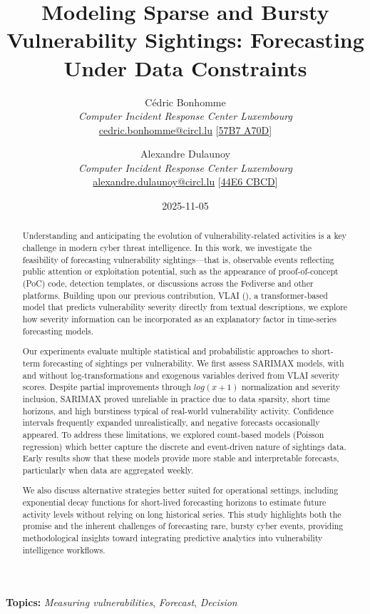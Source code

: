 \documentclass[]{article}
\title{\textbf{Modeling Sparse and Bursty Vulnerability Sightings: Forecasting Under Data Constraints}}
\author{
    Cédric Bonhomme \\
    \textit{Computer Incident Response Center Luxembourg} \\
    \href{mailto:cedric.bonhomme@circl.lu}{cedric.bonhomme@circl.lu} [\href{https://openpgp.circl.lu/pks/lookup?op=get\&search=0xA1CB94DE57B7A70D}{57B7 A70D}]
    \and
    Alexandre Dulaunoy \\
    \textit{Computer Incident Response Center Luxembourg} \\
    \href{mailto:alexandre.dulaunoy@circl.lu}{alexandre.dulaunoy@circl.lu} [\href{https://pgp.circl.lu/pks/lookup?op=get\&search=0x3b12dcc282fa29312f5b709a09e2cd4944e6cbcd}{44E6 CBCD}]
}
\date{2025-11-05}
\begin{document}
\maketitle

\begin{abstract}
Understanding and anticipating the evolution of vulnerability-related activities is a key challenge in modern cyber threat intelligence. In this work, we investigate the feasibility of forecasting vulnerability sightings—that is, observable events reflecting public attention or exploitation potential, such as the appearance of proof-of-concept (PoC) code, detection templates, or discussions across the Fediverse and other platforms. Building upon our previous contribution, VLAI (\cite{bonhomme2025vlairobertabasedmodelautomated}), a transformer-based model that predicts vulnerability severity directly from textual descriptions, we explore how severity information can be incorporated as an explanatory factor in time-series forecasting models.

Our experiments evaluate multiple statistical and probabilistic approaches to short-term forecasting of sightings per vulnerability. We first assess SARIMAX models, with and without log-transformations and exogenous variables derived from VLAI severity scores. Despite partial improvements through $log(x+1)$ normalization and severity inclusion, SARIMAX proved unreliable in practice due to data sparsity, short time horizons, and high burstiness typical of real-world vulnerability activity. Confidence intervals frequently expanded unrealistically, and negative forecasts occasionally appeared. To address these limitations, we explored count-based models (Poisson regression) which better capture the discrete and event-driven nature of sightings data. Early results show that these models provide more stable and interpretable forecasts, particularly when data are aggregated weekly.

We also discuss alternative strategies better suited for operational settings, including exponential decay functions for short-lived forecasting horizons to estimate future activity levels without relying on long historical series. This study highlights both the promise and the inherent challenges of forecasting rare, bursty cyber events, providing methodological insights toward integrating predictive analytics into vulnerability intelligence workflows.
\end{abstract}

\vspace{1em}
\noindent\textbf{Topics:} \textit{Measuring vulnerabilities}, \textit{Forecast}, \textit{Decision}
\end{document}
